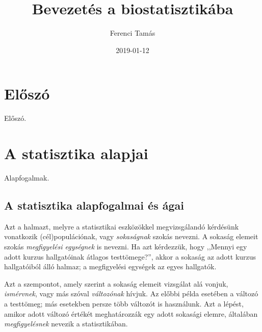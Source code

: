 \documentclass[]{book}
\title{Bevezetés a biostatisztikába}
\author{Ferenci Tamás}
\date{2019-01-12}
\begin{document}
\maketitle

{
\setcounter{tocdepth}{1}
\tableofcontents
}
\chapter{Előszó}\label{eloszo}

Előszó.

\chapter{A statisztika alapjai}\label{a-statisztika-alapjai}

Alapfogalmak.

\section{A statisztika alapfogalmai és
ágai}\label{a-statisztika-alapfogalmai-es-agai}

Azt a halmazt, melyre a statisztikai eszközökkel megvizsgálandó
kérdésünk vonatkozik (cél)populációnak, vagy \emph{sokaságnak} szokás
nevezni. A sokaság elemeit szokás \emph{megfigyelési egységnek} is
nevezni. Ha azt kérdezzük, hogy ,,Mennyi egy adott kurzus hallgatóinak
átlagos testtömege?'', akkor a sokaság az adott kurzus hallgatóiból álló
halmaz; a megfigyelési egységek az egyes hallgatók.

Azt a szempontot, amely szerint a sokaság elemeit vizsgálat alá vonjuk,
\emph{ismérvnek}, vagy más szóval \emph{változónak} hívjuk. Az előbbi
példa esetében a változó a testtömeg; más esetekben persze több változót
is használunk. Azt a lépést, amikor adott változó értékét meghatározzák
egy adott sokasági elemre, általában \emph{megfigyelésnek} nevezik a
statisztikában.
\end{document}
